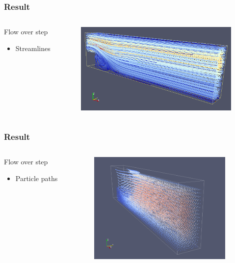 \documentclass{beamer}
\begin{document}
\begin{frame}
\frametitle{Result}
\begin{columns}
\begin{column}{0.30\textwidth}
Flow over step
\begin{itemize}
\item Streamlines
\end{itemize}
\end{column}
\begin{column}{0.70\textwidth}
\includegraphics[height=4.5cm]{flowoverstep.png}
\end{column}
\end{columns}
\end{frame}

\begin{frame}
\frametitle{Result}
\begin{columns}
\begin{column}{0.33\textwidth}
Flow over step
\begin{itemize}
\item Particle paths
\end{itemize}
\end{column}
\begin{column}{0.66\textwidth}
\includegraphics[height=5.5cm]{Step-Particles.png}
\end{column}
\end{columns}
\end{frame}
\end{document}
